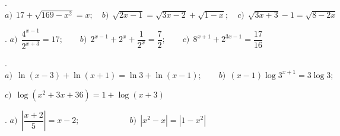 \begin{mipropuesto}
. $a)\ \ 17+\sqrt{169-x^2}=x;\quad b)\ \ \sqrt{2x-1}=\sqrt{3x-2}+\sqrt{1-x};\quad c)\ \ \sqrt{3x+3}-1=\sqrt{8-2x}$	
\end{mipropuesto}
\vspace{-8mm}
\begin{flushright}
	\begin{footnotesize} \textcolor{gris}{}	\end{footnotesize}
\end{flushright}

\begin{mipropuesto}
. $a)\ \ \dfrac{4^{x-1}}{2^{x+3}}=17;\qquad b)\ \ 2^{x-1}+2^x+\dfrac{1}{2^x}=\dfrac 7 2;\qquad c)\ \ 8^{x+1}+2^{3x-1}=\dfrac{17}{16}$	
\end{mipropuesto}
\vspace{-8mm}
\begin{flushright}
	\begin{footnotesize} \textcolor{gris}{}	\end{footnotesize}
\end{flushright}

\begin{mipropuesto}
. $a)\ \ \ln(x-3)+\ln(x+1)=\ln 3+ \ln(x-1);\qquad b)\ \ (x-1)\log 3^{x+1}=3\log 3;$

$c)\ \ \log(x^2+3x+36)=1+\log(x+3)$ 	
\end{mipropuesto}
\vspace{-8mm}
\begin{flushright}
	\begin{footnotesize} \textcolor{gris}{}	\end{footnotesize}
\end{flushright}

\begin{mipropuesto}
. $a)\ \ \left| \dfrac{x+2}{5} \right|=x-2;	\qquad \qquad  \qquad  b)\ \ |x^2-x|=|1-x^2|$
\end{mipropuesto}
\vspace{-8mm}
\begin{flushright}
	\begin{footnotesize} \textcolor{gris}{}	\end{footnotesize}
\end{flushright}

